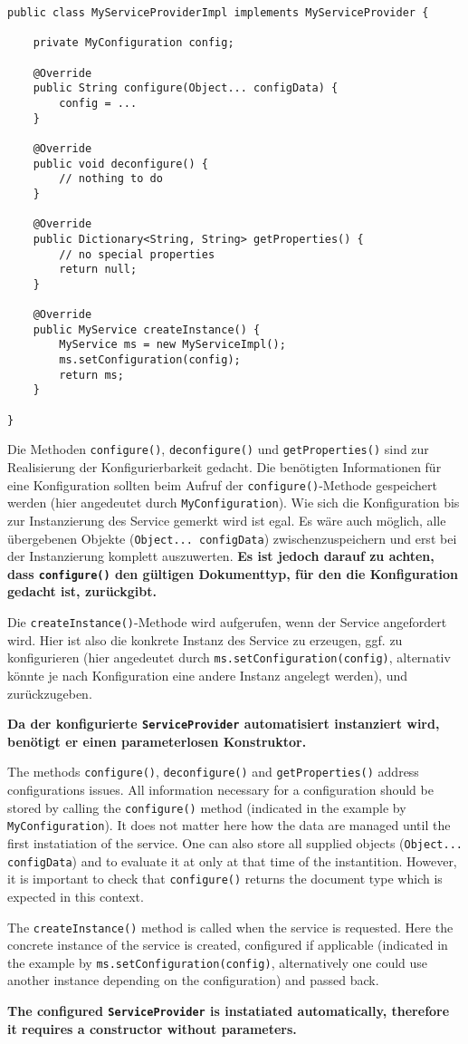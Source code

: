 \documentclass[10pt,a4paper]{scrartcl}
\providecommand{\deutsch}[1]{#1}
\providecommand{\englisch}[1]{{\sffamily #1}}
\begin{document}
\begin{lstlisting}
public class MyServiceProviderImpl implements MyServiceProvider {

	private MyConfiguration config; 

	@Override
	public String configure(Object... configData) {
		config = ...
	}

	@Override
	public void deconfigure() {
		// nothing to do
	}

	@Override
	public Dictionary<String, String> getProperties() {
		// no special properties
		return null;
	}

	@Override
	public MyService createInstance() {
		MyService ms = new MyServiceImpl();
		ms.setConfiguration(config);
		return ms;
	}

}
\end{lstlisting}
\deutsch{Die Methoden \texttt{configure()}, \texttt{deconfigure()} und
\texttt{getProperties()} sind zur Realisierung der Konfigurierbarkeit gedacht.
Die benötigten Informationen für eine Konfiguration sollten beim Aufruf der
\texttt{configure()}-Methode gespeichert werden (hier angedeutet durch
\texttt{MyConfiguration}). Wie sich die Konfiguration bis zur Instanzierung des
Service gemerkt wird ist egal. Es wäre auch möglich, alle übergebenen Objekte
(\texttt{Object... configData}) zwischenzuspeichern und erst bei der
Instanzierung komplett auszuwerten. \textbf{Es ist jedoch darauf zu achten, dass
\texttt{configure()} den gültigen Dokumenttyp, für den die Konfiguration gedacht
ist, zurückgibt.}

Die \texttt{createInstance()}-Methode wird aufgerufen, wenn der Service
angefordert wird. Hier ist also die konkrete Instanz des Service zu erzeugen,
ggf. zu konfigurieren (hier angedeutet durch
\texttt{ms.setConfiguration(config)}, alternativ könnte je nach Konfiguration 
eine andere Instanz angelegt werden), und zurückzugeben.

\textbf{Da der konfigurierte \texttt{ServiceProvider} automatisiert instanziert wird, 
benötigt er einen parameterlosen Konstruktor.}}

\englisch{The methods \texttt{configure()}, \texttt{deconfigure()} and
\texttt{getProperties()} address configurations issues. All information
necessary for a configuration should be stored by calling the
\texttt{configure()} method (indicated in the example by
\texttt{MyConfiguration}). It does not matter here how the data are managed
until the first instatiation of the service. One can also store all supplied
objects (\texttt{Object... configData})  and to evaluate it at only at that time
of the instantition. However, it is important to check that \texttt{configure()}
returns the document type which is expected in this context.

The \texttt{createInstance()} method is called when the service is requested.
Here the concrete instance of the service is created, configured if applicable
(indicated in the example by \texttt{ms.setConfiguration(config)}, alternatively
one could use another instance depending on the configuration) and passed back.

\textbf{The configured \texttt{ServiceProvider} is instatiated automatically, 
therefore it requires a constructor without parameters.}}
\end{document}
